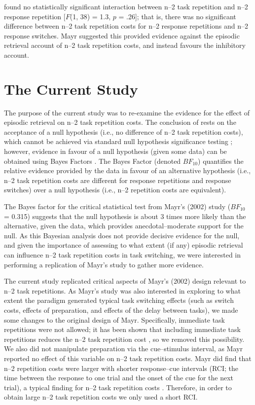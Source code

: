 \documentclass[a4paper, man, natbib]{apa6}
\begin{document}
\cite{Mayr2002} found no statistically significant interaction between n--2 task repetition and n--2 response repetition [$F$(1, 38) = 1.3, $p$ = .26]; that is, there was no significant difference between n--2 task repetition costs for n--2 response repetitions and n--2 response switches. Mayr suggested this provided evidence against the episodic retrieval account of n--2 task repetition costs, and instead favours the inhibitory account.

\section{The Current Study}
The purpose of the current study was to re-examine the evidence for the effect of episodic retrieval on n--2 task repetition costs. The conclusion of \cite{Mayr2002} rests on the acceptance of a null hypothesis (i.e., no difference of n--2 task repetition costs), which cannot be achieved via standard null hypothesis significance testing \citep[NHST;][]{Gallistel2009, Wagenmakers2007}; however, evidence in favour of a null hypothesis (given some data) can be obtained using Bayes Factors \citep[e.g.,][]{Rouder2009}. The Bayes Factor (denoted $BF_{10}$) quantifies the relative evidence provided by the data in favour of an alternative hypothesis (i.e., n--2 task repetition costs are different for response repetitions and response switches) over a null hypothesis (i.e., n--2 repetition costs are equivalent). 

The Bayes factor for the critical statistical test from Mayr's (2002) study ($BF_{10}$ = 0.315) suggests that the null hypothesis is about 3 times more likely than the alternative, given the data, which provides anecdotal--moderate support for the null. As this Bayesian analysis does not provide decisive evidence for the null, and given the importance of assessing to what extent (if any) episodic retrieval can influence n--2 task repetition costs in task switching, we were interested in performing a replication of Mayr's study to gather more evidence.

The current study replicated critical aspects of Mayr's (2002) design relevant to n--2 task repetitions. As Mayr's study was also interested in exploring to what extent the paradigm generated typical task switching effects (such as switch costs, effects of preparation, and effects of the delay between tasks), we made some changes to the original design of Mayr. Specifically, immediate task repetitions were not allowed; it has been shown that including immediate task repetitions reduces the n--2 task repetition cost \citep{Philipp2006}, so we removed this possibility. We also did not manipulate preparation via the cue--stimulus interval, as Mayr reported no effect of this variable on n--2 task repetition costs. Mayr did find that n--2 repetition costs were larger with shorter response--cue intervals (RCI; the time between the response to one trial and the onset of the cue for the next trial), a typical finding for n--2 task repetition costs \citep{Gade2005, Grange2009, Mayr2000}. Therefore, in order to obtain large n--2 task repetition costs we only used a short RCI. 
\end{document}
